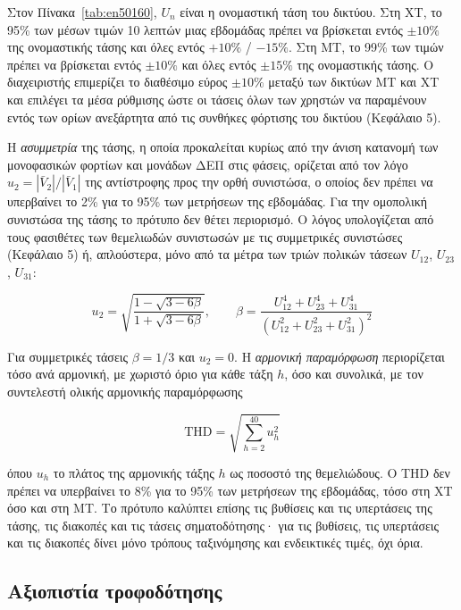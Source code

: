 Στον Πίνακα~\ref{tab:en50160}, $U_n$ είναι η ονομαστική τάση του δικτύου. Στη ΧΤ, το 95\% των
μέσων τιμών 10 λεπτών μιας εβδομάδας πρέπει να βρίσκεται εντός $\pm 10\%$ της ονομαστικής
τάσης και όλες εντός $+10\%$ / $-15\%$. Στη ΜΤ, το 99\% των τιμών πρέπει να βρίσκεται εντός
$\pm 10\%$ και όλες εντός $\pm 15\%$ της ονομαστικής τάσης. Ο διαχειριστής επιμερίζει το
διαθέσιμο εύρος $\pm 10\%$ μεταξύ των δικτύων ΜΤ και ΧΤ και επιλέγει τα μέσα ρύθμισης ώστε οι
τάσεις όλων των χρηστών να παραμένουν εντός των ορίων ανεξάρτητα από τις συνθήκες φόρτισης του
δικτύου (Κεφάλαιο 5).

Η \emph{ασυμμετρία} της τάσης, η οποία προκαλείται κυρίως από την άνιση κατανομή των μονοφασικών
φορτίων και μονάδων ΔΕΠ στις φάσεις, ορίζεται από τον λόγο $u_2 = |\bar{V}_2|/|\bar{V}_1|$
της αντίστροφης προς την ορθή συνιστώσα, ο οποίος δεν πρέπει να υπερβαίνει το 2\% για το 95\%
των μετρήσεων της εβδομάδας. Για την ομοπολική συνιστώσα της τάσης το πρότυπο δεν θέτει
περιορισμό. Ο λόγος υπολογίζεται από τους φασιθέτες των θεμελιωδών
συνιστωσών με τις συμμετρικές συνιστώσες (Κεφάλαιο 5) ή, απλούστερα, μόνο
από τα μέτρα των τριών πολικών τάσεων $U_{12}$, $U_{23}$, $U_{31}$:

\begin{equation}
u_2 = \sqrt{\frac{1 - \sqrt{3 - 6\beta}}{1 + \sqrt{3 - 6\beta}}}, \qquad
\beta = \frac{U_{12}^4 + U_{23}^4 + U_{31}^4}{\left(U_{12}^2 + U_{23}^2 + U_{31}^2\right)^2}
\label{eq:vuf-line}
\end{equation}

Για συμμετρικές τάσεις $\beta = 1/3$ και $u_2 = 0$. Η \emph{αρμονική παραμόρφωση} περιορίζεται
τόσο ανά αρμονική, με χωριστό όριο για κάθε τάξη $h$, όσο και συνολικά, με τον συντελεστή
ολικής αρμονικής παραμόρφωσης

\begin{equation}
\mathrm{THD} = \sqrt{\sum_{h=2}^{40} u_h^2}
\label{eq:thd}
\end{equation}

όπου $u_h$ το πλάτος της αρμονικής τάξης $h$ ως ποσοστό της θεμελιώδους. Ο THD δεν πρέπει να
υπερβαίνει το 8\% για το 95\% των μετρήσεων της εβδομάδας, τόσο στη ΧΤ όσο και στη ΜΤ. Το
πρότυπο καλύπτει επίσης τις βυθίσεις και τις υπερτάσεις της τάσης, τις διακοπές και τις
τάσεις σηματοδότησης· για τις βυθίσεις, τις υπερτάσεις και τις διακοπές δίνει μόνο τρόπους
ταξινόμησης και ενδεικτικές τιμές, όχι όρια.

\subsection{Αξιοπιστία τροφοδότησης}
\label{sec:reliability}


